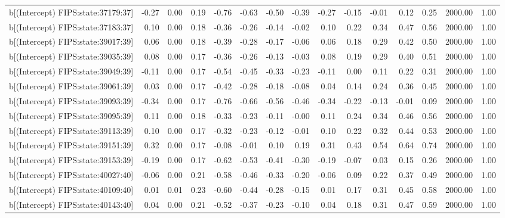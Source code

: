 \begin{table}[ht]
\begin{tabular}{rrrrrrrrrrrrrrr}
  b[(Intercept) FIPS:state:37179:37] & -0.27 & 0.00 & 0.19 & -0.76 & -0.63 & -0.50 & -0.39 & -0.27 & -0.15 & -0.01 & 0.12 & 0.25 & 2000.00 & 1.00 \\ 
  b[(Intercept) FIPS:state:37183:37] & 0.10 & 0.00 & 0.18 & -0.36 & -0.26 & -0.14 & -0.02 & 0.10 & 0.22 & 0.34 & 0.47 & 0.56 & 2000.00 & 1.00 \\ 
  b[(Intercept) FIPS:state:39017:39] & 0.06 & 0.00 & 0.18 & -0.39 & -0.28 & -0.17 & -0.06 & 0.06 & 0.18 & 0.29 & 0.42 & 0.50 & 2000.00 & 1.00 \\ 
  b[(Intercept) FIPS:state:39035:39] & 0.08 & 0.00 & 0.17 & -0.36 & -0.26 & -0.13 & -0.03 & 0.08 & 0.19 & 0.29 & 0.40 & 0.51 & 2000.00 & 1.00 \\ 
  b[(Intercept) FIPS:state:39049:39] & -0.11 & 0.00 & 0.17 & -0.54 & -0.45 & -0.33 & -0.23 & -0.11 & 0.00 & 0.11 & 0.22 & 0.31 & 2000.00 & 1.00 \\ 
  b[(Intercept) FIPS:state:39061:39] & 0.03 & 0.00 & 0.17 & -0.42 & -0.28 & -0.18 & -0.08 & 0.04 & 0.14 & 0.24 & 0.36 & 0.45 & 2000.00 & 1.00 \\ 
  b[(Intercept) FIPS:state:39093:39] & -0.34 & 0.00 & 0.17 & -0.76 & -0.66 & -0.56 & -0.46 & -0.34 & -0.22 & -0.13 & -0.01 & 0.09 & 2000.00 & 1.00 \\ 
  b[(Intercept) FIPS:state:39095:39] & 0.11 & 0.00 & 0.18 & -0.33 & -0.23 & -0.11 & -0.00 & 0.11 & 0.24 & 0.34 & 0.46 & 0.56 & 2000.00 & 1.00 \\ 
  b[(Intercept) FIPS:state:39113:39] & 0.10 & 0.00 & 0.17 & -0.32 & -0.23 & -0.12 & -0.01 & 0.10 & 0.22 & 0.32 & 0.44 & 0.53 & 2000.00 & 1.00 \\ 
  b[(Intercept) FIPS:state:39151:39] & 0.32 & 0.00 & 0.17 & -0.08 & -0.01 & 0.10 & 0.19 & 0.31 & 0.43 & 0.54 & 0.64 & 0.74 & 2000.00 & 1.00 \\ 
  b[(Intercept) FIPS:state:39153:39] & -0.19 & 0.00 & 0.17 & -0.62 & -0.53 & -0.41 & -0.30 & -0.19 & -0.07 & 0.03 & 0.15 & 0.26 & 2000.00 & 1.00 \\ 
  b[(Intercept) FIPS:state:40027:40] & -0.06 & 0.00 & 0.21 & -0.58 & -0.46 & -0.33 & -0.20 & -0.06 & 0.09 & 0.22 & 0.37 & 0.49 & 2000.00 & 1.00 \\ 
  b[(Intercept) FIPS:state:40109:40] & 0.01 & 0.01 & 0.23 & -0.60 & -0.44 & -0.28 & -0.15 & 0.01 & 0.17 & 0.31 & 0.45 & 0.58 & 2000.00 & 1.00 \\ 
  b[(Intercept) FIPS:state:40143:40] & 0.04 & 0.00 & 0.21 & -0.52 & -0.37 & -0.23 & -0.10 & 0.04 & 0.18 & 0.31 & 0.47 & 0.59 & 2000.00 & 1.00 \\ 

\end{tabular}
\end{table}

